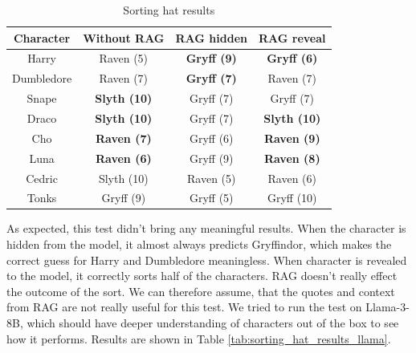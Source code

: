 \documentclass[fleqn,moreauthors,10pt]{ds_report}
\begin{document}
\begin{table}[hbt]
	\caption{Sorting hat results}
	\centering
	\begin{tabular}{c | c | c | c }
		Character  & Without RAG         & RAG hidden         & RAG reveal          \\ \hline
		Harry      & Raven (5)           & \textbf{Gryff (9)} & \textbf{Gryff (6)}  \\
		Dumbledore & Raven (7)           & \textbf{Gryff (7)} & Raven (7)           \\ \hline
		Snape      & \textbf{Slyth (10)} & Gryff (7)          & Gryff (7)           \\
		Draco      & \textbf{Slyth (10)} & Gryff (7)          & \textbf{Slyth (10)} \\ \hline
		Cho        & \textbf{Raven (7)}  & Gryff (6)          & \textbf{Raven (9)}  \\
		Luna       & \textbf{Raven (6)}  & Gryff (9)          & \textbf{Raven (8)}  \\ \hline
		Cedric     & Slyth (10)          & Raven (5)          & Raven (6)           \\
		Tonks      & Gryff (9)           & Gryff (5)          & Gryff (10)          \\
	\end{tabular}
	\label{tab:sorting_hat_results}
\end{table}

As expected, this test didn't bring any meaningful results.
When the character is hidden from the model, it almost always predicts Gryffindor, which makes the correct guess for Harry and Dumbledore meaningless.
When character is revealed to the model, it correctly sorts half of the characters. RAG doesn't really effect the outcome of the sort.
We can therefore assume, that the quotes and context from RAG are not really useful for this test.
We tried to run the test on Llama-3-8B, which should have deeper understanding of characters out of the box to see how it performs.
Results are shown in Table \ref*{tab:sorting_hat_results_llama}.
\end{document}
